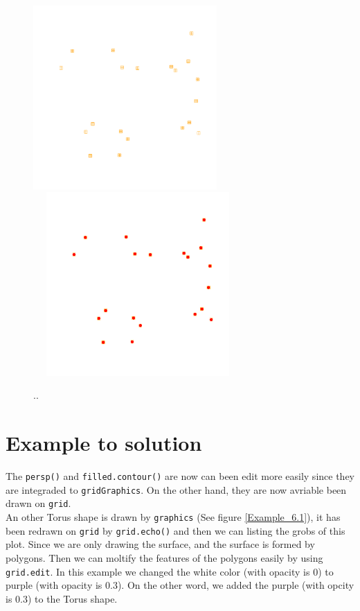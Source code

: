 \documentclass[paper=a4, fontsize=11pt]{report}
\begin{document}
\begin{figure}[h]
\begin{center}
  \includegraphics[height = 7cm, width = 7cm]{figure/Chapter6_example_1.pdf}
  \includegraphics[height = 7cm, width = 8cm]{figure/Chapter6_example_2.pdf}
  \caption{..}
  	\label{Example_6.0}
\end{center}
\end{figure}

\section{Example to solution}
The \texttt{persp()} and \texttt{filled.contour()} are now can been edit more easily since they are integraded to \texttt{gridGraphics}. On the other hand, they are now avriable been drawn on \texttt{grid}.\\
An other Torus shape is drawn by \texttt{graphics} (See figure \ref{Example_6.1}), it has been redrawn on \texttt{grid} by \texttt{grid.echo()} and then we can listing the grobs of this plot. Since we are only drawing the surface, and the surface is formed by polygons. Then we can moltify the features of the polygons easily by using \texttt{grid.edit}. In this example we changed the white color (with opacity is 0) to purple (with opacity is 0.3). On the other word, we added the purple (with opcity is 0.3) to the Torus shape.\\
\end{document}

